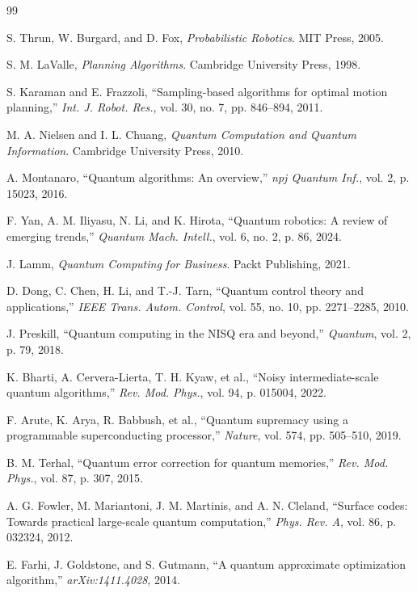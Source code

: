 \documentclass[journal]{IEEEtran}
\begin{document}
\begin{thebibliography}{99}

 S. Thrun, W. Burgard, and D. Fox, \textit{Probabilistic Robotics}. MIT Press, 2005.

 S. M. LaValle, \textit{Planning Algorithms}. Cambridge University Press, 1998.

 S. Karaman and E. Frazzoli, ``Sampling-based algorithms for optimal motion planning,'' \textit{Int. J. Robot. Res.}, vol. 30, no. 7, pp. 846--894, 2011.

 M. A. Nielsen and I. L. Chuang, \textit{Quantum Computation and Quantum Information}. Cambridge University Press, 2010.

 A. Montanaro, ``Quantum algorithms: An overview,'' \textit{npj Quantum Inf.}, vol. 2, p. 15023, 2016.

 F. Yan, A. M. Iliyasu, N. Li, and K. Hirota, ``Quantum robotics: A review of emerging trends,'' \textit{Quantum Mach. Intell.}, vol. 6, no. 2, p. 86, 2024.

 J. Lamm, \textit{Quantum Computing for Business}. Packt Publishing, 2021.

 D. Dong, C. Chen, H. Li, and T.-J. Tarn, ``Quantum control theory and applications,'' \textit{IEEE Trans. Autom. Control}, vol. 55, no. 10, pp. 2271--2285, 2010.

 J. Preskill, ``Quantum computing in the NISQ era and beyond,'' \textit{Quantum}, vol. 2, p. 79, 2018.

 K. Bharti, A. Cervera-Lierta, T. H. Kyaw, et al., ``Noisy intermediate-scale quantum algorithms,'' \textit{Rev. Mod. Phys.}, vol. 94, p. 015004, 2022.

 F. Arute, K. Arya, R. Babbush, et al., ``Quantum supremacy using a programmable superconducting processor,'' \textit{Nature}, vol. 574, pp. 505--510, 2019.

 B. M. Terhal, ``Quantum error correction for quantum memories,'' \textit{Rev. Mod. Phys.}, vol. 87, p. 307, 2015.

 A. G. Fowler, M. Mariantoni, J. M. Martinis, and A. N. Cleland, ``Surface codes: Towards practical large-scale quantum computation,'' \textit{Phys. Rev. A}, vol. 86, p. 032324, 2012.

 E. Farhi, J. Goldstone, and S. Gutmann, ``A quantum approximate optimization algorithm,'' \textit{arXiv:1411.4028}, 2014.


\end{thebibliography}
\end{document}
